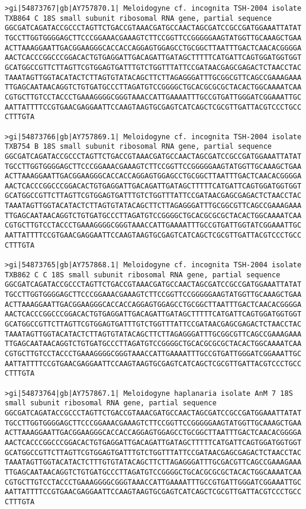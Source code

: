 \documentclass[11pt]{article}
\begin{document}
\begin{Verbatim}[commandchars=\\\{\}]
>gi|54873767|gb|AY757870.1| Meloidogyne cf. incognita TSH-2004 isolate TXB864 C 18S small subunit ribosomal RNA gene, partial sequence
GGCGATCAGATACCGCCCTAGTTCTGACCGTAAACGATGCCAACTAGCGATCCGCCGATGGAAATTATAT
TGCCTTGGTGGGGAGCTTCCCGGAAACGAAAGTCTTCCGGTTCCGGGGGAAGTATGGTTGCAAAGCTGAA
ACTTAAAGGAATTGACGGAAGGGCACCACCAGGAGTGGAGCCTGCGGCTTAATTTGACTCAACACGGGGA
AACTCACCCGGCCCGGACACTGTGAGGATTGACAGATTGATAGCTTTTTCATGATTCAGTGGATGGTGGT
GCATGGCCGTTCTTAGTTCGTGGAGTGATTTGTCTGGTTTATTCCGATAACGAGCGAGACTCTAACCTAC
TAAATAGTTGGTACATACTCTTAGTGTATACAGCTTCTTAGAGGGATTTGCGGCGTTCAGCCGAAAGAAA
TTGAGCAATAACAGGTCTGTGATGCCCTTAGATGTCCGGGGCTGCACGCGCGCTACACTGGCAAAATCAA
CGTGCTTGTCCTACCCTGAAAGGGGCGGGTAAACCATTGAAAATTTGCCGTGATTGGGATCGGAAATTGC
AATTATTTTCCGTGAACGAGGAATTCCAAGTAAGTGCGAGTCATCAGCTCGCGTTGATTACGTCCCTGCC
CTTTGTA

>gi|54873766|gb|AY757869.1| Meloidogyne cf. incognita TSH-2004 isolate TXB754 B 18S small subunit ribosomal RNA gene, partial sequence
GGCGATCAGATACCGCCCTAGTTCTGACCGTAAACGATGCCAACTAGCGATCCGCCGATGGAAATTATAT
TGCCTTGGTGGGGAGCTTCCCGGAAACGAAAGTCTTCCGGTTCCGGGGGAAGTATGGTTGCAAAGCTGAA
ACTTAAAGGAATTGACGGAAGGGCACCACCAGGAGTGGAGCCTGCGGCTTAATTTGACTCAACACGGGGA
AACTCACCCGGCCCGGACACTGTGAGGATTGACAGATTGATAGCTTTTTCATGATTCAGTGGATGGTGGT
GCATGGCCGTTCTTAGTTCGTGGAGTGATTTGTCTGGTTTATTCCGATAACGAGCGAGACTCTAACCTAC
TAAATAGTTGGTACATACTCTTAGTGTATACAGCTTCTTAGAGGGATTTGCGGCGTTCAGCCGAAAGAAA
TTGAGCAATAACAGGTCTGTGATGCCCTTAGATGTCCGGGGCTGCACGCGCGCTACACTGGCAAAATCAA
CGTGCTTGTCCTACCCTGAAAGGGGCGGGTAAACCATTGAAAATTTGCCGTGATTGGTATCGGAAATTGC
AATTATTTTCCGTGAACGAGGAATTCCAAGTAAGTGCGAGTCATCAGCTCGCGTTGATTACGTCCCTGCC
CTTTGTA

>gi|54873765|gb|AY757868.1| Meloidogyne cf. incognita TSH-2004 isolate TXB862 C C 18S small subunit ribosomal RNA gene, partial sequence
GGCGATCAGATACCGCCCTAGTTCTGACCGTAAACGATGCCAACTAGCGATCCGCCGATGGAAATTATAT
TGCCTTGGTGGGGAGCTTCCCGGAAACGAAAGTCTTCCGGTTCCGGGGGAAGTATGGTTGCAAAGCTGAA
ACTTAAAGGAATTGACGGAAGGGCACCACCAGGAGTGGAGCCTGCGGCTTAATTTGACTCAACACGGGGA
AACTCACCCGGCCCGGACACTGTGAGGATTGACAGATTGATAGCTTTTTCATGATTCAGTGGATGGTGGT
GCATGGCCGTTCTTAGTTCGTGGAGTGATTTGTCTGGTTTATTCCGATAACGAGCGAGACTCTAACCTAC
TAAATAGTTGGTACATACTCTTAGTGTATACAGCTTCTTAGAGGGATTTGCGGCGTTCAGCCGAAAGAAA
TTGAGCAATAACAGGTCTGTGATGCCCTTAGATGTCCGGGGCTGCACGCGCGCTACACTGGCAAAATCAA
CGTGCTTGTCCTACCCTGAAAGGGGCGGGTAAACCATTGAAAATTTGCCGTGATTGGGATCGGAAATTGC
AATTATTTTCCGTGAACGAGGAATTCCAAGTAAGTGCGAGTCATCAGCTCGCGTTGATTACGTCCCTGCC
CTTTGTA

>gi|54873764|gb|AY757867.1| Meloidogyne haplanaria isolate AnM 7 18S small subunit ribosomal RNA gene, partial sequence
GGCGATCAGATACCGCCCTAGTTCTGACCGTAAACGATGCCAACTAGCGATCCGCCGATGGAAATTATAT
TGCCTTGGTGGGGAGCTTCCCGGAAACGAAAGTCTTCCGGTTCCGGGGGAAGTATGGTTGCAAAGCTGAA
ACTTAAAGGAATTGACGGAAGGGCACCACCAGGAGTGGAGCCTGCGGCTTAATTTGACTCAACACGGGGA
AACTCACCCGGCCCGGACACTGTGAGGATTGACAGATTGATAGCTTTTTCATGATTCAGTGGATGGTGGT
GCATGGCCGTTCTTAGTTCGTGGAGTGATTTGTCTGGTTTATTCCGATAACGAGCGAGACTCTAACCTAC
TAAATAGTTGGTACATACTCTTTGTGTATACAGCTTCTTAGAGGGATTTGCGACGTTCAGCCGAAAGAAA
TTGAGCAATAACAGGTCTGTGATGCCCTTAGATGTCCGGGGCTGCACGCGCGCTACACTGGCAAAATCAA
CGTGCTTGTCCTACCCTGAAAGGGGCGGGTAAACCATTGAAAATTTGCCGTGATTGGGATCGGAAATTGC
AATTATTTTCCGTGAACGAGGAATTCCAAGTAAGTGCGAGTCATCAGCTCGCGTTGATTACGTCCCTGCC
CTTTGTA


\end{Verbatim}
\end{document}
